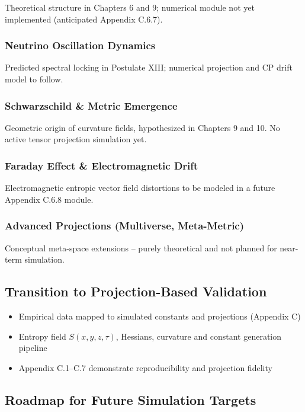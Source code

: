 \documentclass[10.5pt,a4paper]{article}
\begin{document}
Theoretical structure in Chapters 6 and 9; numerical module not yet implemented (anticipated Appendix C.6.7).

\subsubsection{Neutrino Oscillation Dynamics}

Predicted spectral locking in Postulate XIII; numerical projection and CP drift model to follow.

\subsubsection{Schwarzschild \& Metric Emergence}

Geometric origin of curvature fields, hypothesized in Chapters 9 and 10. No active tensor projection simulation yet.

\subsubsection{Faraday Effect \& Electromagnetic Drift}

Electromagnetic entropic vector field distortions to be modeled in a future Appendix C.6.8 module.

\subsubsection{Advanced Projections (Multiverse, Meta-Metric)}

Conceptual meta-space extensions – purely theoretical and not planned for near-term simulation.

\subsection{Transition to Projection-Based Validation}

\begin{itemize}
  \item Empirical data mapped to simulated constants and projections (Appendix C)
  \item Entropy field \( S(x,y,z,\tau) \), Hessians, curvature and constant generation pipeline
  \item Appendix C.1--C.7 demonstrate reproducibility and projection fidelity
\end{itemize}

\subsection{Roadmap for Future Simulation Targets}
\end{document}
